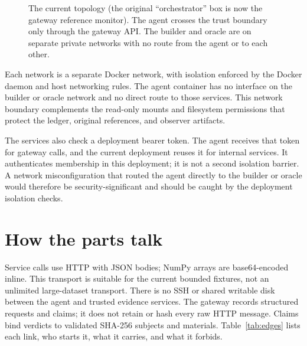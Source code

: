 \documentclass[11pt]{article}
\begin{document}
\begin{figure}[htbp]
\caption{The current topology (the original ``orchestrator'' box is now the
gateway reference monitor). The agent crosses the trust boundary only through
the gateway API. The builder and oracle are on separate private networks with
no route from the agent or to each other.}
\label{fig:topology}
\end{figure}

Each network is a separate Docker network, with isolation enforced by the
Docker daemon and host networking rules. The agent container has no interface
on the builder or oracle network and no direct route to those services. This
network boundary complements the read-only mounts and filesystem permissions
that protect the ledger, original references, and observer artifacts.

The services also check a deployment bearer token. The agent receives that
token for gateway calls, and the current deployment reuses it for internal
services. It authenticates membership in this deployment; it is not a second
isolation barrier. A network misconfiguration that routed the agent directly to
the builder or oracle would therefore be security-significant and should be
caught by the deployment isolation checks.

\section{How the parts talk}

Service calls use HTTP with JSON bodies; NumPy arrays are base64-encoded inline.
This transport is suitable for the current bounded fixtures, not an unlimited
large-dataset transport. There is no SSH or shared writable disk between the
agent and trusted evidence services. The gateway records structured requests
and claims; it does not retain or hash every raw HTTP message. Claims bind
verdicts to validated SHA-256 subjects and materials. Table~\ref{tab:edges} lists each
link, who starts it, what it carries, and what it forbids.
\end{document}
